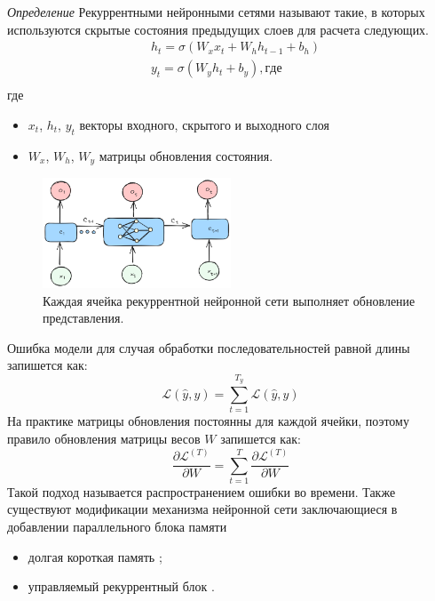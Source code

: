 \textit{Определение} Рекуррентными нейронными сетями называют такие, в которых используются скрытые состояния 
предыдущих слоев для расчета следующих.
\begin{equation}
    \begin{aligned}
        & h_t = \sigma (W_x x_t + W_h h_{t-1}+ b_h) \\
        & y_t = \sigma (W_y h_t + b_y), где \\
    \end{aligned}
\end{equation}
где \begin{itemize}
    \item $x_t$, $h_t$, $y_t$ векторы входного, скрытого и выходного слоя
    \item $W_x$, $W_h$, $W_y$ матрицы обновления состояния.
\end{itemize}
\begin{figure}[h]
    \centering
    \includegraphics[width=0.5\textwidth]{assets/ml/nn/rnn.excalidraw.png}
    \caption{Каждая ячейка рекуррентной нейронной сети выполняет обновление представления.}
    \label{reccurent}
\end{figure}
Ошибка модели для случая обработки последовательностей равной длины запишется как:
\begin{equation}
    \mathcal{L}(\hat{y},y) = \sum_{t=1}^{T_y} \mathcal{L}(\hat{y},y)
\end{equation}
На практике матрицы обновления постоянны для каждой ячейки, поэтому правило обновления матрицы весов $W$ запишется как:
\begin{equation}
    \frac{\partial \mathcal{L}^{(T)}}{\partial W} = \sum_{t=1}^T \frac{\partial \mathcal{L}^{(T)} }{\partial W}
\end{equation}
Такой подход называется распространением ошибки во времени. Также существуют модификации механизма нейронной сети
заключающиеся в добавлении параллельного блока памяти \begin{itemize}
    \item долгая короткая память \cite{ochreiter1997long};
    \item управляемый рекуррентный блок \cite{chung2014empirical}.
\end{itemize}

